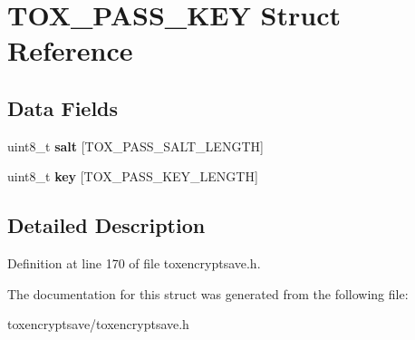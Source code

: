 \hypertarget{struct_t_o_x___p_a_s_s___k_e_y}{\section{T\+O\+X\+\_\+\+P\+A\+S\+S\+\_\+\+K\+E\+Y Struct Reference}
\label{struct_t_o_x___p_a_s_s___k_e_y}
}
\subsection*{Data Fields}
\begin{DoxyCompactItemize}
\item 
\hypertarget{struct_t_o_x___p_a_s_s___k_e_y_a6434f2e799e75beacc91c217bc797339}{uint8\+\_\+t {\bfseries salt} \mbox{[}T\+O\+X\+\_\+\+P\+A\+S\+S\+\_\+\+S\+A\+L\+T\+\_\+\+L\+E\+N\+G\+T\+H\mbox{]}}\label{struct_t_o_x___p_a_s_s___k_e_y_a6434f2e799e75beacc91c217bc797339}

\item 
\hypertarget{struct_t_o_x___p_a_s_s___k_e_y_aaa46672326ab451b679129167f39055e}{uint8\+\_\+t {\bfseries key} \mbox{[}T\+O\+X\+\_\+\+P\+A\+S\+S\+\_\+\+K\+E\+Y\+\_\+\+L\+E\+N\+G\+T\+H\mbox{]}}\label{struct_t_o_x___p_a_s_s___k_e_y_aaa46672326ab451b679129167f39055e}

\end{DoxyCompactItemize}


\subsection{Detailed Description}


Definition at line 170 of file toxencryptsave.\+h.



The documentation for this struct was generated from the following file\+:\begin{DoxyCompactItemize}
\item 
toxencryptsave/toxencryptsave.\+h\end{DoxyCompactItemize}
